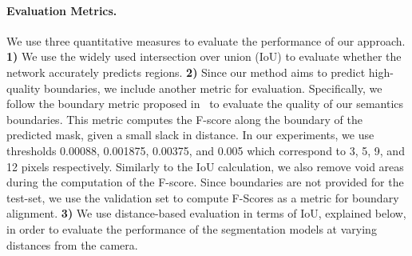 \documentclass[10pt,twocolumn,letterpaper]{article}
\begin{document}
\paragraph{Evaluation Metrics.}
We use three quantitative measures to evaluate the performance  of our approach. 
\textbf{1)} We use the widely used intersection over union (IoU) to evaluate whether the network accurately predicts regions.
\textbf{2)} Since our method aims to predict high-quality boundaries, we include another metric for evaluation. Specifically, we follow the boundary metric proposed in~\cite{perazzi2016benchmark} to evaluate the quality of our semantics boundaries.
This metric computes the F-score along the boundary of the predicted mask, given a small slack in distance.
In our experiments, we use thresholds 0.00088, 0.001875, 0.00375, and 0.005 which correspond to 3, 5, 9, and 12 pixels respectively. 
Similarly to the IoU calculation, we also remove void areas 
during the computation of the F-score. Since 
boundaries 
are not provided for the test-set, we use the validation set to compute F-Scores as a metric for boundary alignment.
\textbf{3)}  We use distance-based evaluation in terms of IoU, explained below,  in order to evaluate the performance of the segmentation models at varying distances from the camera. 

\begin{table}
\vspace{-3mm}
\begin{minipage}{0.45\textwidth}
\centering
\vspace{-3mm}
\caption{Comparison of the shape stream, GCL, and additional image gradient features (Canny) for different regular streams. Score on Cityscapes val (\%)  represents mean over all classes and F-Score represents boundary alignment (th=5px).}
\label{tbl_effect_gcl_hf_gcl}
\end{minipage}
\end{table}
\end{document}
